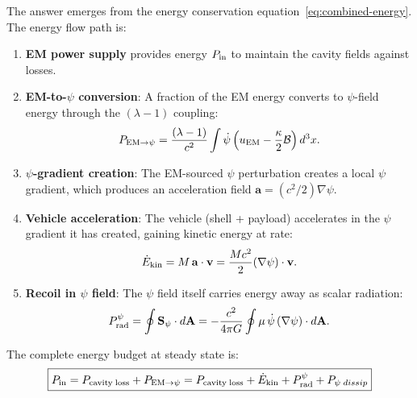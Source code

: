 \documentclass[aps,prd,twocolumn,superscriptaddress,floatfix,nofootinbib]{revtex4-2}
\newcommand{\avec}{\mathbf{a}}
\newcommand{\mufunction}{\mu}
\newcommand{\lam}{\lambda}
\newcommand{\kap}{\kappa}
\newcommand{\calB}{\mathcal{B}}
\begin{document}
The answer emerges from the energy conservation
equation~\eqref{eq:combined-energy}. The energy flow path is:

\begin{enumerate}
\item \textbf{EM power supply} provides energy $P_{\rm in}$ to maintain
the cavity fields against losses.

\item \textbf{EM-to-$\psi$ conversion}: A fraction of the EM energy
converts to $\psi$-field energy through the $(\lam-1)$ coupling:
\begin{equation}
P_{\rm EM\to\psi} = \frac{(\lam-1)}{c^2}\int \dot\psi
\left(u_{\rm EM} - \frac{\kap}{2}\calB\right)d^3x.
\label{eq:P-EM-psi}
\end{equation}

\item \textbf{$\psi$-gradient creation}: The EM-sourced $\psi$
perturbation creates a local $\psi$ gradient, which produces an
acceleration field $\avec = (c^2/2)\nabla\psi$.

\item \textbf{Vehicle acceleration}: The vehicle (shell + payload)
accelerates in the $\psi$ gradient it has created, gaining kinetic
energy at rate:
\begin{equation}
\dot{E}_{\rm kin} = M\,\avec\cdot\mathbf{v}
= \frac{Mc^2}{2}(\nabla\psi)\cdot\mathbf{v}.
\label{eq:Ekin-rate}
\end{equation}

\item \textbf{Recoil in $\psi$ field}: The $\psi$ field itself carries
energy away as scalar radiation:
\begin{equation}
P_{\rm rad}^\psi = \oint \mathbf{S}_\psi\cdot d\mathbf{A}
= -\frac{c^2}{4\pi G}\oint \mufunction\,\dot\psi\,
(\nabla\psi)\cdot d\mathbf{A}.
\label{eq:P-rad}
\end{equation}
\end{enumerate}

The complete energy budget at steady state is:
\begin{equation}
\boxed{
P_{\rm in} = P_{\rm cavity\;loss} + P_{\rm EM\to\psi}
= P_{\rm cavity\;loss} + \dot{E}_{\rm kin} + P_{\rm rad}^\psi
+ P_{\psi\;dissip}
}
\label{eq:energy-budget}
\end{equation}
\end{document}
